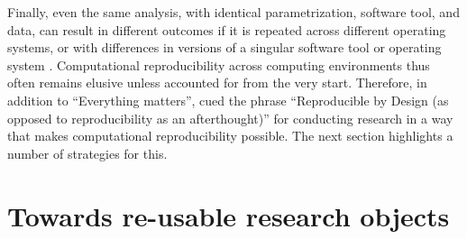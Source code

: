 Finally, even the same analysis, with identical parametrization, software tool, and data, can result in different outcomes if it is repeated across different operating systems, or with differences in versions of a singular software tool or operating system \citep{gronenschild2012effects, glatard2015reproducibility}.
Computational reproducibility across computing environments thus often remains elusive unless accounted for from the very start.
Therefore, in addition to ``Everything matters'',  \citet{kennedy2019everything} cued the phrase ``Reproducible by Design (as opposed to reproducibility as an afterthought)'' for conducting research in a way that makes computational reproducibility possible.
The next section highlights a number of strategies for this.



\section{Towards re-usable research objects}


